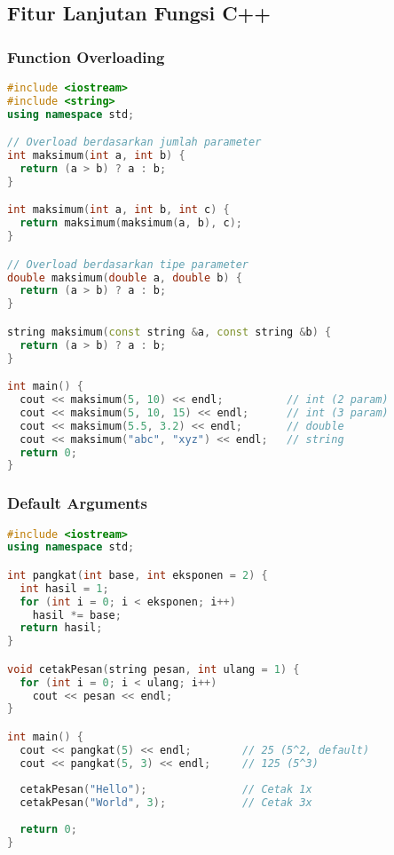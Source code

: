\documentclass[../main.tex]{subfiles}
\begin{document}
\subsection{Fitur Lanjutan Fungsi C++}
\subsubsection{Function Overloading}
\begin{lstlisting}[language=C++, caption={Overloading fungsi}]
#include <iostream>
#include <string>
using namespace std;

// Overload berdasarkan jumlah parameter
int maksimum(int a, int b) {
  return (a > b) ? a : b;
}

int maksimum(int a, int b, int c) {
  return maksimum(maksimum(a, b), c);
}

// Overload berdasarkan tipe parameter
double maksimum(double a, double b) {
  return (a > b) ? a : b;
}

string maksimum(const string &a, const string &b) {
  return (a > b) ? a : b;
}

int main() {
  cout << maksimum(5, 10) << endl;          // int (2 param)
  cout << maksimum(5, 10, 15) << endl;      // int (3 param)
  cout << maksimum(5.5, 3.2) << endl;       // double
  cout << maksimum("abc", "xyz") << endl;   // string
  return 0;
}
\end{lstlisting}

\subsubsection{Default Arguments}
\begin{lstlisting}[language=C++, caption={Default argument}]
#include <iostream>
using namespace std;

int pangkat(int base, int eksponen = 2) {
  int hasil = 1;
  for (int i = 0; i < eksponen; i++)
    hasil *= base;
  return hasil;
}

void cetakPesan(string pesan, int ulang = 1) {
  for (int i = 0; i < ulang; i++)
    cout << pesan << endl;
}

int main() {
  cout << pangkat(5) << endl;        // 25 (5^2, default)
  cout << pangkat(5, 3) << endl;     // 125 (5^3)
  
  cetakPesan("Hello");               // Cetak 1x
  cetakPesan("World", 3);            // Cetak 3x
  
  return 0;
}
\end{lstlisting}
\end{document}
